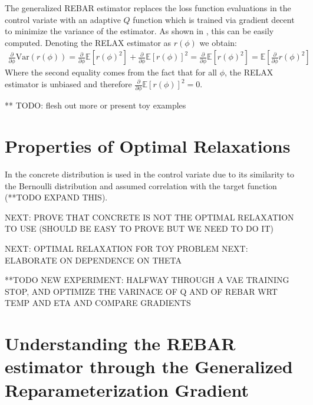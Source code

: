 \documentclass{article}
\newcommand{\relaxed}{\tilde f}
\newcommand{\var}{\text{Var}}
\begin{document}
The generalized REBAR estimator replaces the loss function evaluations in the control variate with an adaptive $Q$ function which is trained via gradient decent to minimize the variance of the estimator. As shown in \cite{tucker2017rebar}, this can be easily computed. Denoting the RELAX estimator as $r(\phi)$ we obtain:
\begin{align}
    \frac{\partial}{\partial\phi}\var{(r(\phi))} = \frac{\partial}{\partial\phi}\mathbb{E}[r(\phi)^2] + \frac{\partial}{\partial\phi}\mathbb{E}[r(\phi)]^2 = \frac{\partial}{\partial\phi}\mathbb{E}[r(\phi)^2] = \mathbb{E}[\frac{\partial}{\partial\phi}r(\phi)^2]
\end{align}
Where the second equality comes from the fact that for all $\phi$, the RELAX estimator is unbiased and therefore $\frac{\partial}{\partial\phi}\mathbb{E}[r(\phi)]^2 = 0$.


** TODO: flesh out more or present toy examples

\section{Properties of Optimal Relaxations}
In \cite{tucker2017rebar} the concrete distribution \cite{maddison2016concrete} is used in the control variate due to its similarity to the Bernoulli distribution and assumed correlation with the target function (**TODO EXPAND THIS).

NEXT: PROVE THAT CONCRETE IS NOT THE OPTIMAL RELAXATION TO USE (SHOULD BE EASY TO PROVE BUT WE NEED TO DO IT)

NEXT: OPTIMAL RELAXATION FOR TOY PROBLEM
NEXT: ELABORATE ON DEPENDENCE ON THETA


**TODO NEW EXPERIMENT: HALFWAY THROUGH A VAE TRAINING STOP, AND OPTIMIZE THE VARINACE OF Q AND OF REBAR WRT TEMP AND ETA AND COMPARE GRADIENTS


\section{Understanding the REBAR estimator through the Generalized Reparameterization Gradient}
\end{document}
